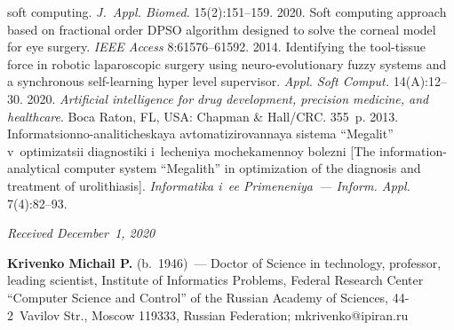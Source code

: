 \begin{multicols}{2}
{{\begin{thebibliography}{99}
soft computing. \textit{J.~Appl. Biomed.} 15(2):151--159.
 2020. Soft computing approach based on 
fractional order DPSO algorithm designed to solve the corneal model for eye surgery. 
\textit{IEEE Access} 8:61576--61592.
 2014. Identifying the tool-tissue force in robotic 
laparoscopic surgery using neuro-evolutionary fuzzy systems and a synchronous self-learning hyper level 
supervisor. \textit{Appl. Soft Comput.} 14(A):12--30.
 2020. \textit{Artificial intelligence for drug development, precision medicine, and healthcare}. Boca 
Raton, FL, USA: Chapman \& Hall/CRC. 355~p.
 2013. 
Informatsionno-analiticheskaya avtomatizirovannaya sistema ``Megalit'' v~optimizatsii diagnostiki 
i~lecheniya mochekamennoy bolezni [The information-analytical computer system ``Megalith'' in optimization 
of the diagnosis and treatment of urolithiasis]. \textit{Informatika i~ee Primeneniya~--- Inform. Appl.}
 7(4):82--93.
 
 \end{thebibliography}

 }
 }

\end{multicols}

\vspace*{-3pt}

  \hfill{\small\textit{Received December~1, 2020}}






\Contrl

\noindent
\textbf{Krivenko Michail P.} (b.\ 1946)~--- Doctor of Science in technology, professor, leading scientist, 
Institute of Informatics Problems, Federal Research Center ``Computer Science and Control'' of the Russian 
Academy of Sciences, 44-2~Vavilov Str., Moscow 119333, Russian Federation; 
\mbox{mkrivenko@ipiran.ru}

\label{end\stat}

\renewcommand{\bibname}{\protect\rm Литература}